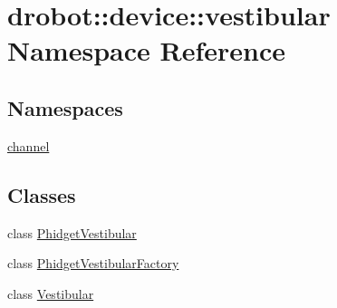 \hypertarget{namespacedrobot_1_1device_1_1vestibular}{\section{drobot\-:\-:device\-:\-:vestibular Namespace Reference}
\label{namespacedrobot_1_1device_1_1vestibular}
}
\subsection*{Namespaces}
\begin{DoxyCompactItemize}
\item 
\hyperlink{namespacedrobot_1_1device_1_1vestibular_1_1channel}{channel}
\end{DoxyCompactItemize}
\subsection*{Classes}
\begin{DoxyCompactItemize}
\item 
class \hyperlink{classdrobot_1_1device_1_1vestibular_1_1PhidgetVestibular}{Phidget\-Vestibular}
\item 
class \hyperlink{classdrobot_1_1device_1_1vestibular_1_1PhidgetVestibularFactory}{Phidget\-Vestibular\-Factory}
\item 
class \hyperlink{classdrobot_1_1device_1_1vestibular_1_1Vestibular}{Vestibular}
\end{DoxyCompactItemize}
